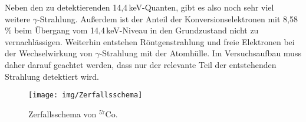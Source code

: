 	Neben den zu detektierenden 14,4\,keV-Quanten, gibt es also noch sehr viel weitere $\gamma$-Strahlung. Außerdem ist der Anteil der Konversionselektronen mit 8,58\,\% beim Übergang vom 14,4\,keV-Niveau in den Grundzustand nicht zu vernachlässigen. Weiterhin entstehen Röntgenstrahlung und freie Elektronen bei der Wechselwirkung von $\gamma$-Strahlung mit der Atomhülle. Im Versuchsaufbau muss daher darauf geachtet werden, dass nur der relevante Teil der entstehenden Strahlung detektiert wird.    
    
	\begin{figure}[H]
		\centering
		\texttt{[image: img/Zerfallsschema]}
		\caption{Zerfallsschema von $^{57}$Co.\cite{wwu}}
		\label{fig:zerfallsschema}
	\end{figure}
